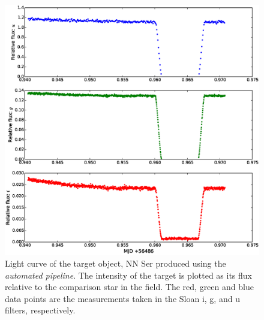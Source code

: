 \begin{figure}
\centering
\includegraphics[width=140mm]{images/nnser_lightcurve_automated.eps}
\caption{Light curve of the target object, NN Ser produced using the \emph{automated pipeline}. The intensity of the target is plotted as its flux relative to the comparison star in the field. The red, green and blue data points are the measurements taken in the Sloan i, g, and u filters, respectively.}
\label{fig:nnserlightcurveautomated}
\end{figure}

